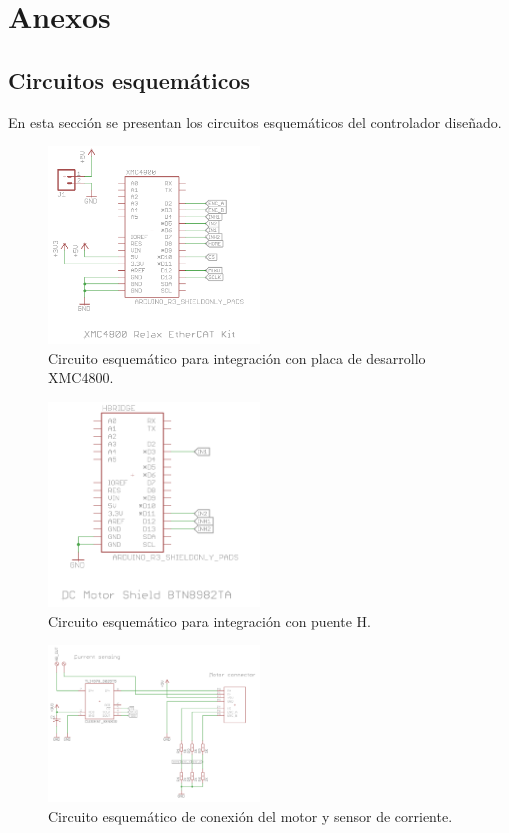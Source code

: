\chapter{Anexos}

\section{Circuitos esquemáticos}\label{anexo_esq}

En esta sección se presentan los circuitos esquemáticos del controlador diseñado.

\begin{figure}[H]
  \centering
  \includegraphics[width=0.5\textwidth]{img/anexo/xmc4800_schematic}
  \caption{Circuito esquemático para integración con placa de desarrollo XMC4800.}
  \label{anexo_esq_xmc4800}
\end{figure}

\begin{figure}[H]
  \centering
  \includegraphics[width=0.5\textwidth]{img/anexo/puente_h_schematic}
  \caption{Circuito esquemático para integración con puente H.}
  \label{anexo_esq_puente_h}
\end{figure}


\begin{figure}[H]
  \centering
  \includegraphics[width=0.5\textwidth]{img/anexo/current_sensor_schematic}
  \caption{Circuito esquemático de conexión del motor y sensor de corriente.}
  \label{anexo_esq_motor}
\end{figure}

